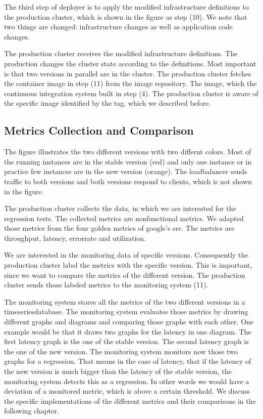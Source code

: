 The third step of deployer is to apply the modified infrastructure definitions to the
production cluster, which is shown in the figure as step (10). We note that two things are
changed: infrastructure changes as well as application code changes.

The production cluster receives the modified infrastructure definitions. The production
changes the cluster state according to the definitions. Most important is that two
versions in parallel are in the cluster. The production cluster fetches the container
image in step (11) from the image repository. The image, which the continuous integration
system built in step (4). The production cluster is aware of the specific image identified
by the tag, which we described before.

\subsection{Metrics Collection and Comparison}

The figure illustrates the two different versions with two differnt colors. Most of the
running instances are in the stable version (red) and only one instance or in practice few
instances are in the new version (orange). The loadbalancer sends traffic to both versions
and both versions respond to clients, which is not shown in the figure.

The production cluster collects the data, in which we are interested for the regression
tests.  The collected metrics are nonfunctional metrics. We adapted those metrics from the
four golden metrics of google's sre. The metrics are throughput, latency, errorrate and
utilization.

We are interested in the monitoring data of specific versions. Consequently the production
cluster label the metrics with the specific version. This is important, since we want to
compare the metrics of the different version.  The production cluster sends those labeled
metrics to the monitoring system (11).

The monitoring system stores all the metrics of the two different versions in a
timeseriesdatabase. The monitoring system evaluates those metrics by drawing different
graphs and diagrams and comparing those graphs with each other. One example would be that
it draws two graphs for the latency in one diagram. The first latency graph is the one of
the stable version. The second latency graph is the one of the new version. The monitoring
system monitors now those two graphs for a regression. That means in the case of latency,
that if the latency of the new version is much bigger than the latency of the stable
version, the monitoring system detects this as a regression. In other words we would have
a deviation of a monitored metric, which is above a certain threshold. We discuss the
specific implementations of the different metrics and their comparisons in the following
chapter.

